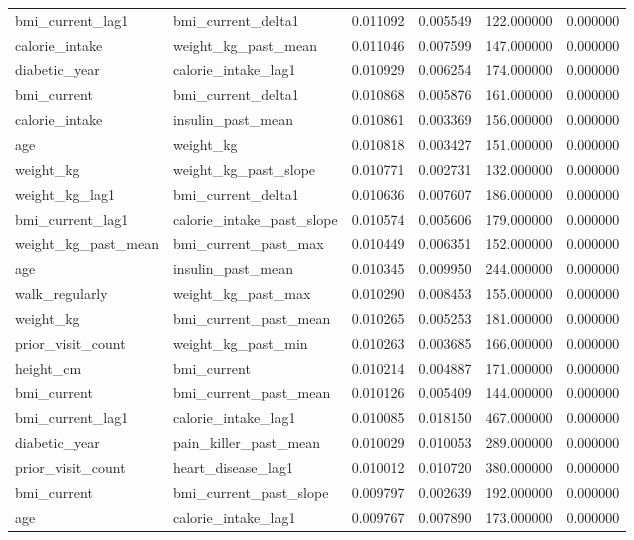 \begin{longtable}{llrrrr}
bmi\_current\_lag1 & bmi\_current\_delta1 & 0.011092 & 0.005549 & 122.000000 & 0.000000 \\
calorie\_intake & weight\_kg\_past\_mean & 0.011046 & 0.007599 & 147.000000 & 0.000000 \\
diabetic\_year & calorie\_intake\_lag1 & 0.010929 & 0.006254 & 174.000000 & 0.000000 \\
bmi\_current & bmi\_current\_delta1 & 0.010868 & 0.005876 & 161.000000 & 0.000000 \\
calorie\_intake & insulin\_past\_mean & 0.010861 & 0.003369 & 156.000000 & 0.000000 \\
age & weight\_kg & 0.010818 & 0.003427 & 151.000000 & 0.000000 \\
weight\_kg & weight\_kg\_past\_slope & 0.010771 & 0.002731 & 132.000000 & 0.000000 \\
weight\_kg\_lag1 & bmi\_current\_delta1 & 0.010636 & 0.007607 & 186.000000 & 0.000000 \\
bmi\_current\_lag1 & calorie\_intake\_past\_slope & 0.010574 & 0.005606 & 179.000000 & 0.000000 \\
weight\_kg\_past\_mean & bmi\_current\_past\_max & 0.010449 & 0.006351 & 152.000000 & 0.000000 \\
age & insulin\_past\_mean & 0.010345 & 0.009950 & 244.000000 & 0.000000 \\
walk\_regularly & weight\_kg\_past\_max & 0.010290 & 0.008453 & 155.000000 & 0.000000 \\
weight\_kg & bmi\_current\_past\_mean & 0.010265 & 0.005253 & 181.000000 & 0.000000 \\
prior\_visit\_count & weight\_kg\_past\_min & 0.010263 & 0.003685 & 166.000000 & 0.000000 \\
height\_cm & bmi\_current & 0.010214 & 0.004887 & 171.000000 & 0.000000 \\
bmi\_current & bmi\_current\_past\_mean & 0.010126 & 0.005409 & 144.000000 & 0.000000 \\
bmi\_current\_lag1 & calorie\_intake\_lag1 & 0.010085 & 0.018150 & 467.000000 & 0.000000 \\
diabetic\_year & pain\_killer\_past\_mean & 0.010029 & 0.010053 & 289.000000 & 0.000000 \\
prior\_visit\_count & heart\_disease\_lag1 & 0.010012 & 0.010720 & 380.000000 & 0.000000 \\
bmi\_current & bmi\_current\_past\_slope & 0.009797 & 0.002639 & 192.000000 & 0.000000 \\
age & calorie\_intake\_lag1 & 0.009767 & 0.007890 & 173.000000 & 0.000000 \\

\end{longtable}
